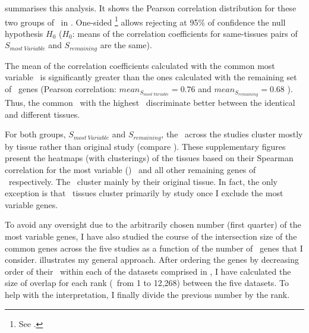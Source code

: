  summarises this analysis.
It shows the Pearson correlation distribution
for these two groups of \pcgs\ in \setOne.
One-sided \Welchttest\footnote{See .}
allows rejecting at 95\% of confidence the null hypothesis $H_0$
($H_0$: means of the correlation coefficients for
same-tissues pairs of $S_{most~Variable}$ and $S_{remaining}$ are the same).

The mean of the %
correlation coefficients
calculated with the common most variable \pcgs\ is significantly greater than
the ones calculated with the remaining set of \setOne\ genes%
 (Pearson correlation:
$mean_{S_{most~Variable}}=0.76$ and $mean_{S_{remaining}}=0.68$
).
Thus, the common \pcgs\ with the highest \cv\
discriminate better between the identical and different tissues.

For both groups,
$S_{most~Variable}$ and $S_{remaining}$,
the \treps\ across the studies cluster mostly by tissue rather than
original study (compare ).
These supplementary figures present
the heatmaps (with clusterings) of the tissues
based on their Spearman correlation for the most variable (\cv) \pcgs\
and all other remaining genes of \setOne\ respectively.
The \treps\ cluster mainly by their original tissue.
In fact, the only exception is that
\castle\ tissues cluster primarily by study
once I exclude the most variable genes.

To avoid any oversight due to the arbitrarily chosen number (first quarter)
of the most variable genes,
I have also studied the course of the intersection size of the common genes
across the five studies
as a function of the number of \setOne\ genes that I consider.
 illustrates my general approach.
After ordering the genes by decreasing order of their \cv\
within each of the datasets comprised in \setOne,
I have calculated the size of overlap for each rank (\ie\ from 1 to 12,268)
between the five datasets.
To help with the interpretation,
I finally divide the previous number by the rank.

